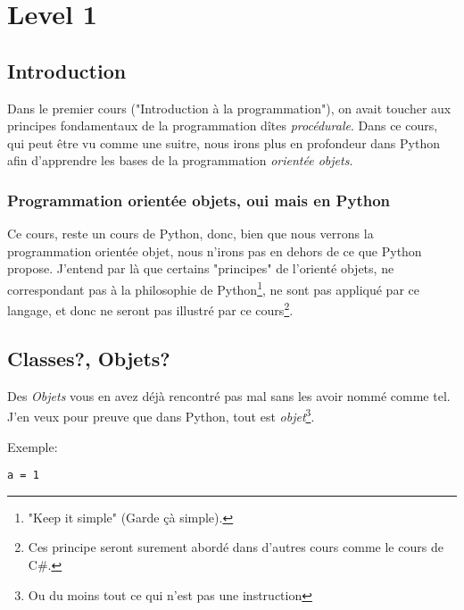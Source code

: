 


\chapter{Level 1}
\begin{figure}[ht]
\end{figure}

\section{Introduction}

Dans le premier cours ("Introduction à la programmation"), on avait toucher aux principes fondamentaux de la programmation dîtes \emph{procédurale}. Dans ce cours, qui peut être vu comme une suitre, nous irons plus en profondeur dans Python afin d'apprendre les bases de la programmation \emph{orientée objets}.

\subsection{Programmation orientée objets, oui mais en Python}

Ce cours, reste un cours de Python, donc, bien que nous verrons la programmation orientée objet, nous n'irons pas en dehors de ce que Python propose. J'entend par là que certains "principes" de l'orienté objets, ne correspondant pas à la philosophie de Python\footnote{"Keep it simple" (Garde çà simple).}, ne sont pas appliqué par ce langage, et donc ne seront pas illustré par ce cours\footnote{Ces principe seront surement abordé dans d'autres cours comme le cours de C\#.}.


\section{Classes?, Objets?}

Des \emph{Objets} vous en avez déjà rencontré pas mal sans les avoir nommé comme tel.
J'en veux pour preuve que dans Python, tout est \emph{objet}\footnote{Ou du moins tout ce qui n'est pas une instruction}.

Exemple:

\begin{lstlisting}
a = 1
\end{lstlisting}

